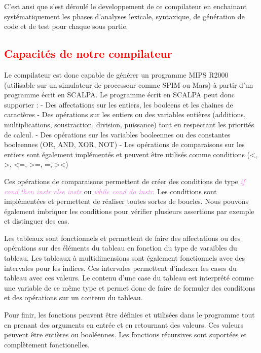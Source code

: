 \documentclass[a4paper]{article}
\let\oldtextit\textit
\renewcommand{\textit}[1]{\textcolor{violet}{\oldtextit{#1}}}
\newcommand{\csection}[1]{\textcolor{red}{\section{#1}}}
\begin{document}
C'est ansi que s'est déroulé le developpement de ce compilateur en enchainant systématiquement les phases d'analyses lexicale, syntaxique, de génération de code et de test pour chaque sous partie.

\csection{Capacités de notre compilateur}

Le compilateur est donc capable de générer un programme MIPS R2000 (utilisable sur un simulateur de processeur comme SPIM ou Mars) à partir d'un programme écrit en SCALPA.
Le programme écrit en SCALPA peut donc supporter :
- Des affectations sur les entiers, les booleens et les chaines de caractères
- Des opérations sur les entiers ou des variables entières (additions, multiplications, soustraction, division, puissance) tout en respectant les priorités de calcul.
- Des opérations sur les variables booleennes ou des constantes booleennes (OR, AND, XOR, NOT)
- Les opérations de comparaisons sur les entiers sont également implémentés et peuvent être utilisés comme conditions (<, >, <=, >=, =, ><)

Ces opérations de comparaisons permettent de créer des conditions de type \textit{if cond then instr else instr } ou \textit{while cond do instr}. Les conditions sont implémentées et permettent de réaliser toutes sortes de boucles. Nous pouvons également imbriquer les conditions pour vérifier plusieurs assertions par exemple et distinguer des cas.

Les tableaux sont fonctionnels et permettent de faire des affectations ou des opérations sur des éléments du tableau en fonction du type de varaibles du tableau. Les tableaux à multidimensions sont également fonctionnels avec des intervales pour les indices. Ces intervales permettent d'indexer les cases du tableau avec ces valeurs.
Le contenu d'une case du tableau est interprété comme une variable de ce même type et permet donc de faire de formuler des conditions et des opérations sur un contenu du tableau.

Pour finir, les fonctions peuvent être définies et utilisées dans le programme tout en prenant des arguments en entrée et en retournant des valeurs. Ces valeurs peuvent être entières ou booléennes. Les fonctions récursives sont suportées et complètement fonctionelles.
\end{document}
